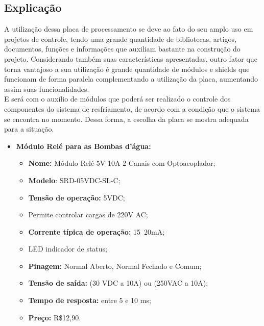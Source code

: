 \subsection{Explicação}
A utilização dessa placa de processamento se deve ao fato do seu amplo uso em projetos de controle, tendo uma grande quantidade de bibliotecas, artigos, documentos, funções e informações que auxiliam bastante na construção do projeto. Considerando também suas características apresentadas, outro fator que torna vantajoso a sua utilização é grande quantidade de módulos e shields que funcionam de forma paralela complementando a utilização da placa, aumentando assim suas funcionalidades. \\
E será com o auxílio de módulos que poderá ser realizado o controle dos componentes do sistema de resfriamento, de acordo com a condição que o sistema se encontra no momento. Dessa forma, a escolha da placa se mostra adequada para a situação.\\
\begin{itemize}
	\item \textbf{Módulo Relé para as Bombas d'água:}
	\begin{itemize}
		\item \textbf{Nome:} Módulo Relé 5V 10A 2 Canais com Optoacoplador;
		\item \textbf{Modelo}: SRD-05VDC-SL-C;
		\item \textbf{Tensão de operação:} 5VDC;
		\item Permite controlar cargas de 220V AC;
		\item \textbf{Corrente típica de operação:} 15~20mA;
		\item LED indicador de status;
		\item \textbf{Pinagem:} Normal Aberto, Normal Fechado e Comum;
		\item \textbf{Tensão de saída:} (30 VDC a 10A) ou (250VAC a 10A);
		\item \textbf{Tempo de resposta:} entre 5 e 10 ms;
		\item \textbf{Preço:} R\$12,90.
	\end{itemize} 
\end{itemize}
